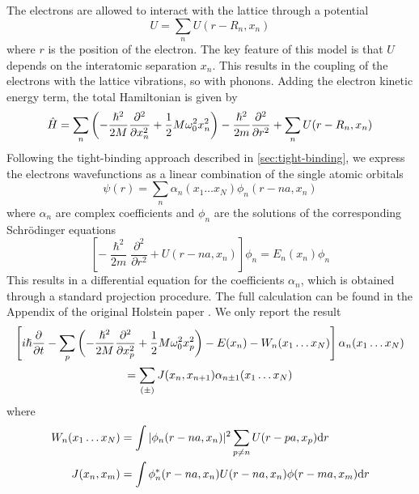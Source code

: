 The electrons are allowed to interact with the lattice through a potential
\begin{equation}
    U = \sum_n U(r-R_n, x_n)
\end{equation}
where $r$ is the position of the electron. The key feature of this model is that $U$ depends on the interatomic separation $x_n$. This results in the coupling of the electrons with the lattice vibrations, so with phonons. Adding the electron kinetic energy term, the total Hamiltonian is given by
\begin{equation}
    \hat{H} = \sum_n \left( -\frac{\hslash^2}{2M} \frac{\partial^2}{\partial x_n^2} + \frac{1}{2} M\omega_0^2x_n^2 \right)
    -\frac{\hslash^2}{2m} \frac{\partial^2}{\partial r^2}
    +     \sum_n U(r-R_n, x_n)
\end{equation}
Following the tight-binding approach described in \cref{sec:tight-binding}, we express the electrons wavefunctions as a linear combination of the single atomic orbitals
\begin{equation}
    \psi(r) = \sum_{n} \alpha_{n}(x_1 \dots x_N) \phi_n(r-na, x_n)
\end{equation}
where $\alpha_n$ are complex coefficients and $\phi_n$ are the solutions of the corresponding Schrödinger equations
\begin{equation}
    \left[ -\frac{\hslash^2}{2m} \frac{\partial^2}{\partial r^2} + U(r-na, x_n) \right] \phi_n = E_n(x_n) \phi_n
\end{equation}
This results in a differential equation for the coefficients $\alpha_n$, which is obtained through a standard projection procedure. The full calculation can be found in the Appendix of the original Holstein paper \cite{holstein1959}. We only report the result
\begin{multline} \label{eq:holstein_diff}
    \left[ i\hslash \pdv{}{t} - \sum_p \left( -\frac{\hslash^2}{2M} \pdv[2]{}{x_p} + \frac{1}{2} M \omega_0^2 x_p^2 \right) - E(x_n) - W_n(x_1\dots x_N) \right] \alpha_n(x_1\dots x_N)
    \\= \sum_{(\pm)} J(x_n, x_{n+1}) \alpha_{n\pm1}(x_1\dots x_N)
\end{multline}
where
\begin{align}
    W_n(x_1 \dots x_N) & = \int |\phi_n(r-na, x_n)|^2  \sum_{p \neq n} U(r-pa, x_p)  \differential r \\
    J(x_n, x_m)        & = \int \phi_n^*(r-na, x_n) U(r-na, x_n) \phi(r-ma, x_m) \differential r
\end{align}


